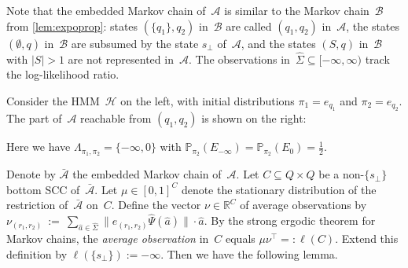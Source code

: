 \documentclass[a4paper,UKenglish,cleveref, autoref,mathscr]{lipics-v2019}
\newcommand{\RR}{\mathbb{R}}
\newcommand{\PP}{\mathbb{P}}
\newcommand{\1}{\mathbbm{1}}
\newcommand{\A}{\mathcal{A}}
\newcommand{\B}{\mathcal{B}}
\renewcommand{\H}{\mathcal{H}}
\newcommand{\oA}{\bar{\A}}
\newcommand*{\DrawBoundingBox}[1][]{%
    \draw [
        draw=gray,
    ]
    ([shift={(-1pt,-1pt)}]current bounding box.south west)
    rectangle ([shift={(1pt,1pt)}]current bounding box.north east);
}
\begin{document}
Note that the embedded Markov chain of~$\A$ is similar to the Markov chain~$\B$ from \cref{lem:expoprop}:
states $(\{q_1\}, q_2)$ in~$\B$ are called $(q_1,q_2)$ in~$\A$, the states $(\emptyset,q)$ in~$\B$ are subsumed by the state $s_\bot$ of~$\A$, and the states $(S,q)$ in~$\B$ with $|S| > 1$ are not represented in~$\A$.
The observations in~$\hat\Sigma \subseteq [-\infty, \infty)$ track the log-likelihood ratio.

\begin{example} \label{ex:det2}
Consider the HMM~$\H$ on the left, with initial distributions $\pi_1 = e_{q_1}$ and $\pi_2 = e_{q_2}$.
The part of~$\A$ reachable from $(q_1,q_2)$ is shown on the right:
\begin{center}
\end{center}
Here we have $\Lambda_{\pi_1,\pi_2} = \{-\infty,0\}$ with $\PP_{\pi_2}(E_{-\infty}) = \PP_{\pi_2}(E_0) = \frac12$.
\end{example}

Denote by $\oA$ the embedded Markov chain of~$\A$.
Let $C \subseteq Q \times Q$ be a non-$\{s_\bot\}$ bottom SCC of~$\oA$.
Let $\mu \in [0,1]^C$ denote the stationary distribution of the restriction of~$\oA$ on~$C$.
Define the vector $\nu \in \RR^C$ of average observations by
$
 \nu_{(r_1,r_2)} \ := \ \sum_{\hat a \in \hat\Sigma} \| e_{(r_1,r_2)} \hat\Psi(\hat a) \| \cdot \hat a
$.
By the strong ergodic theorem for Markov chains, the \emph{average observation} in~$C$ equals $\mu \nu^\top =: \ell(C)$.
Extend this definition by $\ell(\{s_\bot\}) := -\infty$.
Then we have the following lemma.
\end{document}
